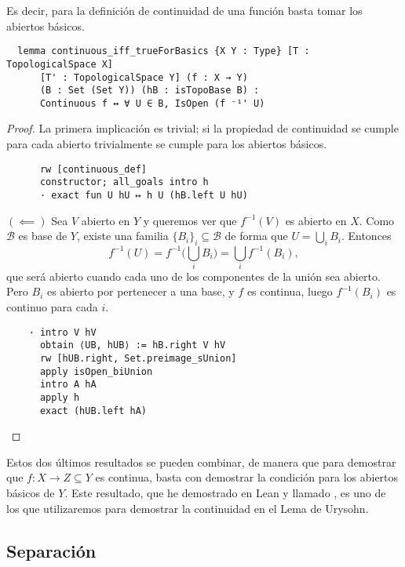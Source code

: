 Es decir, para la definición de continuidad de una función basta tomar los abiertos básicos.

\begin{lstlisting}
  lemma continuous_iff_trueForBasics {X Y : Type} [T : TopologicalSpace X]
      [T' : TopologicalSpace Y] (f : X → Y)
      (B : Set (Set Y)) (hB : isTopoBase B) :
      Continuous f ↔ ∀ U ∈ B, IsOpen (f ⁻¹' U)
\end{lstlisting}

\begin{proof}
  La primera implicación es trivial; si la propiedad de continuidad se cumple para cada abierto trivialmente se cumple para los abiertos básicos.

  \begin{lstlisting}
      rw [continuous_def]
      constructor; all_goals intro h
      · exact fun U hU ↦ h U (hB.left U hU)
  \end{lstlisting}

  $(\impliedby)$ Sea $V$ abierto en $Y$ y queremos ver que $f^{-1}(V)$ es abierto en $X$. Como $\mathcal{B}$ es base de $Y$, existe una familia $\{B_i\}_i \subseteq \mathcal{B}$ de forma que $U = \bigcup_i B_i$. Entonces $$
  f^{-1}(U) = f^{-1}\big(\bigcup_i B_i\big) = \bigcup_i f^{-1}(B_i),
  $$
  que será abierto cuando cada uno de los componentes de la unión sea abierto. Pero $B_i$ es abierto por pertenecer a una base, y $f$ es continua, luego $f^{-1}(B_i)$ es continuo para cada $i$.

  \begin{lstlisting}
    · intro V hV
      obtain ⟨UB, hUB⟩ := hB.right V hV
      rw [hUB.right, Set.preimage_sUnion]
      apply isOpen_biUnion
      intro A hA
      apply h
      exact (hUB.left hA)
  \end{lstlisting}

\end{proof}

Estos dos últimos resultados se pueden combinar, de manera que para demostrar que $f : X \to Z \subseteq Y$ es continua, basta con demostrar la condición para los abiertos básicos de $Y$. Este resultado, que he demostrado en Lean y llamado , es uno de los que utilizaremos para demostrar la continuidad en el Lema de Urysohn.


\subsection{Separación}

